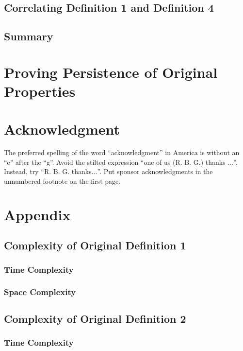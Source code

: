 \documentclass[conference]{IEEEtran}
\begin{document}
\subsection{Correlating Definition 1 and Definition 4}

\subsection{Summary}

\section{Proving Persistence of Original Properties}

\section{Acknowledgment}

The preferred spelling of the word ``acknowledgment'' in America is without 
an ``e'' after the ``g''. Avoid the stilted expression ``one of us (R. B. 
G.) thanks $\ldots$''. Instead, try ``R. B. G. thanks$\ldots$''. Put sponsor 
acknowledgments in the unnumbered footnote on the first page.

\section{Appendix}

\subsection{Complexity of Original Definition 1}

\subsubsection{Time Complexity}

\subsubsection{Space Complexity}

\subsection{Complexity of Original Definition 2}

\subsubsection{Time Complexity}
\end{document}
